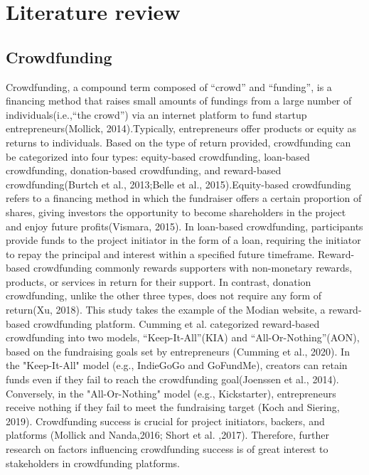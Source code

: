 \documentclass[a4paper]{article}
\begin{document}
\section{Literature review}
\subsection{Crowdfunding}
Crowdfunding, a compound term composed of “crowd” and “funding”, is a financing method that raises small amounts of fundings from a large number of individuals(i.e.,“the crowd”) via an internet platform to fund startup entrepreneurs(Mollick, 2014).Typically, entrepreneurs offer products or equity as returns to individuals. Based on the type of return provided, crowdfunding can be categorized into four types: equity-based crowdfunding, loan-based crowdfunding, donation-based crowdfunding, and reward-based crowdfunding(Burtch et al., 2013;Belle et al., 2015).Equity-based crowdfunding refers to a financing method in which the fundraiser offers a certain proportion of shares, giving investors the opportunity to become shareholders in the project and enjoy future profits(Vismara, 2015). In loan-based crowdfunding, participants provide funds to the project initiator in the form of a loan, requiring the initiator to repay the principal and interest within a specified future timeframe. Reward-based crowdfunding commonly rewards supporters with non-monetary rewards, products, or services in return for their support. In contrast, donation crowdfunding, unlike the other three types, does not require any form of return(Xu, 2018). This study takes the example of the Modian website, a reward-based crowdfunding platform. Cumming et al. categorized reward-based crowdfunding into two models, “Keep-It-All”(KIA) and “All-Or-Nothing”(AON), based on the fundraising goals set by entrepreneurs (Cumming et al., 2020). In the "Keep-It-All" model (e.g., IndieGoGo and GoFundMe), creators can retain funds even if they fail to reach the crowdfunding goal(Joenssen et al., 2014). Conversely, in the "All-Or-Nothing" model (e.g., Kickstarter), entrepreneurs receive nothing if they fail to meet the fundraising target (Koch and Siering, 2019). Crowdfunding success is crucial for project initiators, backers, and platforms (Mollick and Nanda,2016; Short et al. ,2017). Therefore, further research on factors influencing crowdfunding success is of great interest to stakeholders in crowdfunding platforms.
\end{document}
